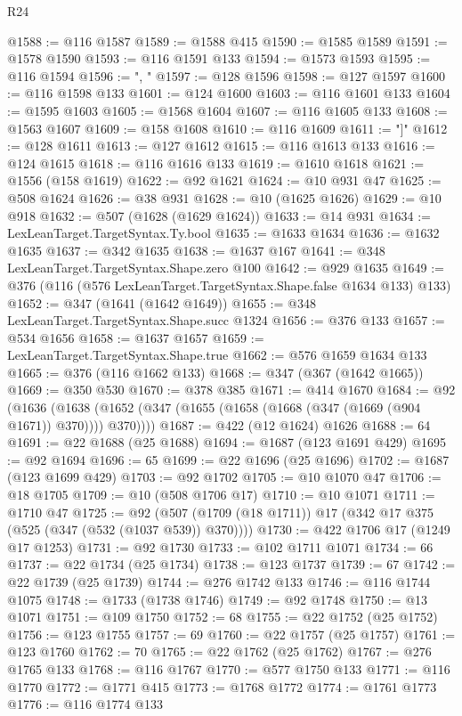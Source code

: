 \begin{lexlean}{R24}
\begin{coremodule}
@1588 := @116 @1587
@1589 := @1588 @415
@1590 := @1585 @1589
@1591 := @1578 @1590
@1593 := @116 @1591 @133
@1594 := @1573 @1593
@1595 := @116 @1594
@1596 := ", "
@1597 := @128 @1596
@1598 := @127 @1597
@1600 := @116 @1598 @133
@1601 := @124 @1600
@1603 := @116 @1601 @133
@1604 := @1595 @1603
@1605 := @1568 @1604
@1607 := @116 @1605 @133
@1608 := @1563 @1607
@1609 := @158 @1608
@1610 := @116 @1609
@1611 := "]"
@1612 := @128 @1611
@1613 := @127 @1612
@1615 := @116 @1613 @133
@1616 := @124 @1615
@1618 := @116 @1616 @133
@1619 := @1610 @1618
@1621 := @1556 (@158 @1619)
@1622 := @92 @1621
@1624 := @10 @931 @47
@1625 := @508 @1624
@1626 := @38 @931
@1628 := @10 (@1625 @1626)
@1629 := @10 @918
@1632 := @507 (@1628 (@1629 @1624))
@1633 := @14 @931
@1634 := LexLeanTarget.TargetSyntax.Ty.bool
@1635 := @1633 @1634
@1636 := @1632 @1635
@1637 := @342 @1635
@1638 := @1637 @167
@1641 := @348 LexLeanTarget.TargetSyntax.Shape.zero @100
@1642 := @929 @1635
@1649 := @376 (@116 (@576 LexLeanTarget.TargetSyntax.Shape.false @1634 @133) @133)
@1652 := @347 (@1641 (@1642 @1649))
@1655 := @348 LexLeanTarget.TargetSyntax.Shape.succ @1324
@1656 := @376 @133
@1657 := @534 @1656
@1658 := @1637 @1657
@1659 := LexLeanTarget.TargetSyntax.Shape.true
@1662 := @576 @1659 @1634 @133
@1665 := @376 (@116 @1662 @133)
@1668 := @347 (@367 (@1642 @1665))
@1669 := @350 @530
@1670 := @378 @385
@1671 := @414 @1670
@1684 := @92
    (@1636 (@1638 (@1652 (@347 (@1655 (@1658 (@1668 (@347 (@1669 (@904 @1671)) @370)))) @370))))
@1687 := @422 (@12 @1624) @1626
@1688 := 64
@1691 := @22 @1688 (@25 @1688)
@1694 := @1687 (@123 @1691 @429)
@1695 := @92 @1694
@1696 := 65
@1699 := @22 @1696 (@25 @1696)
@1702 := @1687 (@123 @1699 @429)
@1703 := @92 @1702
@1705 := @10 @1070 @47
@1706 := @18 @1705
@1709 := @10 (@508 @1706 @17)
@1710 := @10 @1071
@1711 := @1710 @47
@1725 := @92 (@507 (@1709 (@18 @1711)) @17 (@342 @17 @375 (@525 (@347 (@532 (@1037 @539)) @370))))
@1730 := @422 @1706 @17 (@1249 @17 @1253)
@1731 := @92 @1730
@1733 := @102 @1711 @1071
@1734 := 66
@1737 := @22 @1734 (@25 @1734)
@1738 := @123 @1737
@1739 := 67
@1742 := @22 @1739 (@25 @1739)
@1744 := @276 @1742 @133
@1746 := @116 @1744 @1075
@1748 := @1733 (@1738 @1746)
@1749 := @92 @1748
@1750 := @13 @1071
@1751 := @109 @1750
@1752 := 68
@1755 := @22 @1752 (@25 @1752)
@1756 := @123 @1755
@1757 := 69
@1760 := @22 @1757 (@25 @1757)
@1761 := @123 @1760
@1762 := 70
@1765 := @22 @1762 (@25 @1762)
@1767 := @276 @1765 @133
@1768 := @116 @1767
@1770 := @577 @1750 @133
@1771 := @116 @1770
@1772 := @1771 @415
@1773 := @1768 @1772
@1774 := @1761 @1773
@1776 := @116 @1774 @133

\end{coremodule}
\end{lexlean}
